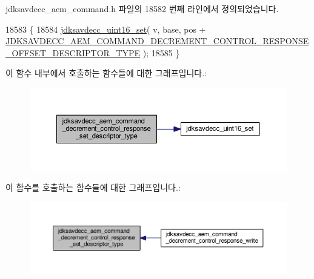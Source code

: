 jdksavdecc\+\_\+aem\+\_\+command.\+h 파일의 18582 번째 라인에서 정의되었습니다.


\begin{DoxyCode}
18583 \{
18584     \hyperlink{group__endian_ga14b9eeadc05f94334096c127c955a60b}{jdksavdecc\_uint16\_set}( v, base, pos + 
      \hyperlink{group__command__decrement__control__response_gaf3e4791b7da2318cf80405887a7af8c6}{JDKSAVDECC\_AEM\_COMMAND\_DECREMENT\_CONTROL\_RESPONSE\_OFFSET\_DESCRIPTOR\_TYPE}
       );
18585 \}
\end{DoxyCode}


이 함수 내부에서 호출하는 함수들에 대한 그래프입니다.\+:
\nopagebreak
\begin{figure}[H]
\begin{center}
\leavevmode
\includegraphics[width=350pt]{group__command__decrement__control__response_ga403042c261f6380c846a20370dbf5a3c_cgraph}
\end{center}
\end{figure}




이 함수를 호출하는 함수들에 대한 그래프입니다.\+:
\nopagebreak
\begin{figure}[H]
\begin{center}
\leavevmode
\includegraphics[width=350pt]{group__command__decrement__control__response_ga403042c261f6380c846a20370dbf5a3c_icgraph}
\end{center}
\end{figure}


